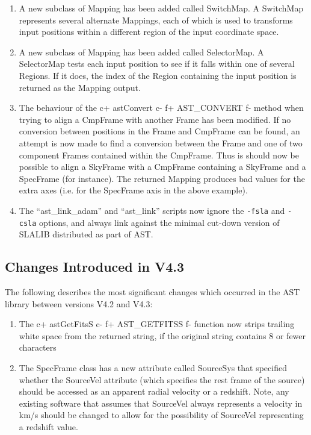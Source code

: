 \documentclass[twoside,11pt]{starlink}
\begin{document}
\begin{enumerate}
\item A new subclass of Mapping has been added called SwitchMap. A
SwitchMap represents several alternate Mappings, each of which is used to
transforms input positions within a different region of the input
coordinate space.

\item A new subclass of Mapping has been added called SelectorMap. A
SelectorMap tests each input position to see if it falls within one of
several Regions. If it does, the index of the Region containing the
input position is returned as the Mapping output.

\item The behaviour of the
c+
astConvert
c-
f+
AST\_CONVERT
f-
method when trying to align a CmpFrame with another Frame has been
modified. If no conversion between positions in the Frame and CmpFrame
can be found, an attempt is now made to find a conversion between the
Frame and one of two component Frames contained within the CmpFrame. Thus
is should now be possible to align a SkyFrame with a CmpFrame containing a
SkyFrame and a SpecFrame (for instance). The returned Mapping produces bad
values for the extra axes (i.e. for the SpecFrame axis in the above example).

\item The ``ast\_link\_adam'' and ``ast\_link'' scripts now ignore the
\verb+-fsla+ and \verb+-csla+ options, and always link against the
minimal cut-down version of SLALIB distributed as part of AST.

\end{enumerate}

\subsection{Changes Introduced in V4.3}

The following describes the most significant changes which occurred in the
AST library between versions V4.2 and V4.3:

\begin{enumerate}

\item The
c+
astGetFitsS
c-
f+
AST\_GETFITSS
f-
function now strips trailing white space from the returned string, if the
original string contains 8 or fewer characters

\item The SpecFrame class has a new attribute called SourceSys that specified
whether the SourceVel attribute (which specifies the rest frame of the
source) should be accessed as an apparent radial velocity or a redshift.
Note, any existing software that assumes that SourceVel always represents
a velocity in km/s should be changed to allow for the possibility of
SourceVel representing a redshift value.

\end{enumerate}
\end{document}
